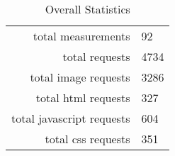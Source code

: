 \begin{table}[h]
\caption{Overall Statistics}\centering
\begin{tabular}{rl}
total measurements & 92\\
total requests & 4734\\
total image requests & 3286\\
total html requests & 327\\
total javascript requests & 604\\
total css requests & 351\\
\end{tabular}
\end{table}
